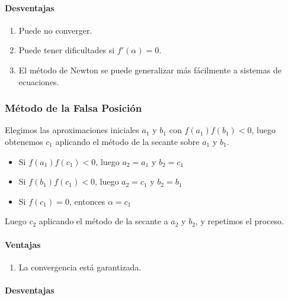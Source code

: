 \hypertarget{desventajas-1}{%
\paragraph{Desventajas}\label{desventajas-1}}

\begin{enumerate}
\def\labelenumi{\arabic{enumi}.}
\tightlist
\item
  Puede no converger.
\item
  Puede tener dificultades si \(f'(\alpha) = 0\).
\item
  El método de Newton se puede generalizar más fácilmente a sistemas de
  ecuaciones.
\end{enumerate}

\hypertarget{muxe9todo-de-la-falsa-posiciuxf3n}{%
\subsubsection{Método de la Falsa
Posición}\label{muxe9todo-de-la-falsa-posiciuxf3n}}

Elegimos las aproximaciones iniciales \(a_1\) y \(b_1\) con
\(f(a_1)f(b_1) < 0\), luego obtenemos \(c_1\) aplicando el método de la
secante sobre \(a_1\) y \(b_1\).

\begin{itemize}
\tightlist
\item
  Si \(f(a_1)f(c_1) < 0\), luego \(a_2 = a_1\) y \(b_2 = c_1\)
\item
  Si \(f(b_1)f(c_1) < 0\), luego \(a_2 = c_1\) y \(b_2 = b_1\)
\item
  Si \(f(c_1) = 0\), entonces \(\alpha = c_1\)
\end{itemize}

Luego \(c_2\) aplicando el método de la secante a \(a_2\) y \(b_2\), y
repetimos el proceso.

\hypertarget{ventajas-3}{%
\paragraph{Ventajas}\label{ventajas-3}}

\begin{enumerate}
\def\labelenumi{\arabic{enumi}.}
\tightlist
\item
  La convergencia está garantizada.
\end{enumerate}

\hypertarget{desventajas-2}{%
\paragraph{Desventajas}\label{desventajas-2}}

